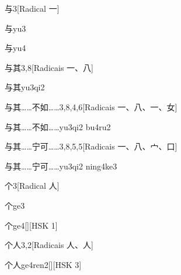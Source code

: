 \begin{entry}{与}{3}[Radical ⼀]
  \begin{phonetics}{与}{yu3}
  \end{phonetics}
  \begin{phonetics}{与}{yu4}
  \end{phonetics}
\end{entry}

\begin{entry}{与其}{3,8}[Radicais ⼀、⼋]
  \begin{phonetics}{与其}{yu3qi2}
  \end{phonetics}
\end{entry}

\begin{entry}{与其……不如……}{3,8,4,6}[Radicais ⼀、⼋、⼀、⼥]
  \begin{phonetics}{与其……不如……}{yu3qi2 bu4ru2}
  \end{phonetics}
\end{entry}

\begin{entry}{与其……宁可……}{3,8,5,5}[Radicais ⼀、⼋、⼧、⼝]
  \begin{phonetics}{与其……宁可……}{yu3qi2 ning4ke3}
  \end{phonetics}
\end{entry}

\begin{entry}{个}{3}[Radical ⼈]
  \begin{phonetics}{个}{ge3}
  \end{phonetics}
  \begin{phonetics}{个}{ge4}[][HSK 1]
  \end{phonetics}
\end{entry}

\begin{entry}{个人}{3,2}[Radicais ⼈、⼈]
  \begin{phonetics}{个人}{ge4ren2}[][HSK 3]
  \end{phonetics}
\end{entry}


